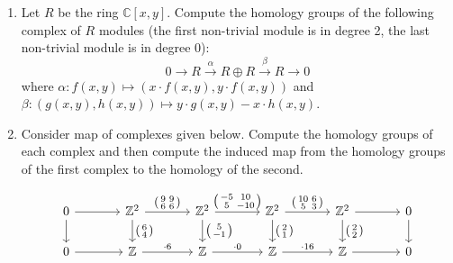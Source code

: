 \documentclass[12pt]{article}
\newcommand{\ZZ}{\mathbb{Z}}
\newcommand{\CC}{\mathbb{C}}
\begin{document}
\begin{enumerate}
\item Let $R$ be the ring $\CC [x,y]$. Compute
the homology groups of the following complex of $R$ modules
(the first non-trivial module is in degree 2, the last non-trivial
module is in degree 0):
\[
0\to R \xrightarrow{\,\, \alpha  \,\,}  R\oplus R \xrightarrow{\,\, \beta  \,\,}
R   \to 0
\]
where $\alpha : f(x,y)\mapsto (x\cdot f(x,y),y\cdot f(x,y))$ and
$\beta : (g(x,y),h(x,y)) \mapsto y\cdot g(x,y)- x\cdot h(x,y)$.  
\item
Consider map of complexes given below. Compute the homology groups of
each complex and then compute the induced map from the homology groups
of the first complex to the homology of the second.

\[
\begin{tikzcd}[column sep=large,ampersand replacement=\&]
0 \arrow{r}\arrow{d} \&
\ZZ^{2} \arrow{d}{\left(\begin{smallmatrix} 6\\ 4 \end{smallmatrix} \right)} \arrow{r}{
 \left( \begin{smallmatrix} 9 & 9 \\ 6 & 6 \end{smallmatrix}  \right) } \& 
\ZZ^{2}  \arrow{d}{\left(\begin{smallmatrix} 5\\ -1 \end{smallmatrix} \right)} \arrow{r}{ \left( \begin{smallmatrix} -5 & 10 \\ 5 & -10 \end{smallmatrix}  \right) } \& 
\ZZ^{2}  \arrow{d}{\left(\begin{smallmatrix} 2\\ 1 \end{smallmatrix}
\right)} \arrow{r}{  \left( \begin{smallmatrix} 10 & 6 \\ 5 & 3 \end{smallmatrix} \right) } \&
\ZZ^{2}  \arrow{d}{\left(\begin{smallmatrix} 2\\ 2 \end{smallmatrix} \right)} \arrow{r} \& 0 \arrow{d} \\
0 \arrow{r} \&
\ZZ \arrow{r}{ \cdot 6 } \& 
\ZZ \arrow{r}{\cdot 0 } \& 
\ZZ \arrow{r}{ \cdot 16 } \&
\ZZ \arrow{r} \& 0 
\end{tikzcd}
\]



\end{enumerate}





          
\end{document}
